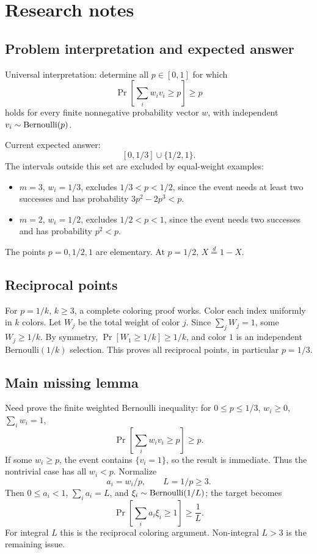 \documentclass[12pt]{article}
\begin{document}
\section*{Research notes}

\subsection*{Problem interpretation and expected answer}

Universal interpretation: determine all \(p\in[0,1]\) for which
\[
 \Pr\left[\sum_i w_i v_i\ge p\right]\ge p
\]
holds for every finite nonnegative probability vector \(w\), with independent
\(v_i\sim{\rm Bernoulli}(p)\).

Current expected answer:
\[
 [0,1/3]\cup\{1/2,1\}.
\]
The intervals outside this set are excluded by equal-weight examples:
\begin{itemize}
\item \(m=3\), \(w_i=1/3\), excludes \(1/3<p<1/2\), since the event needs at
  least two successes and has probability \(3p^2-2p^3<p\).
\item \(m=2\), \(w_i=1/2\), excludes \(1/2<p<1\), since the event needs two
  successes and has probability \(p^2<p\).
\end{itemize}
The points \(p=0,1/2,1\) are elementary.  At \(p=1/2\), \(X\stackrel d=1-X\).

\subsection*{Reciprocal points}

For \(p=1/k\), \(k\ge3\), a complete coloring proof works.  Color each index
uniformly in \(k\) colors.  Let \(W_j\) be the total weight of color \(j\).  Since
\(\sum_j W_j=1\), some \(W_j\ge1/k\).  By symmetry,
\(\Pr[W_1\ge1/k]\ge1/k\), and color \(1\) is an independent Bernoulli\((1/k)\)
selection.  This proves all reciprocal points, in particular \(p=1/3\).

\subsection*{Main missing lemma}

Need prove the finite weighted Bernoulli inequality:
for \(0\le p\le1/3\), \(w_i\ge0\), \(\sum_i w_i=1\),
\[
 \Pr\left[\sum_i w_i v_i\ge p\right]\ge p.
\]
If some \(w_i\ge p\), the event contains \(\{v_i=1\}\), so the result is
immediate.  Thus the nontrivial case has all \(w_i<p\).  Normalize
\[
 a_i=w_i/p,\qquad L=1/p\ge3.
\]
Then \(0\le a_i<1\), \(\sum_i a_i=L\), and \(\xi_i\sim{\rm Bernoulli}(1/L)\);
the target becomes
\[
 \Pr\left[\sum_i a_i\xi_i\ge1\right]\ge\frac1L .
\]
For integral \(L\) this is the reciprocal coloring argument.  Non-integral
\(L>3\) is the remaining issue.
\end{document}
